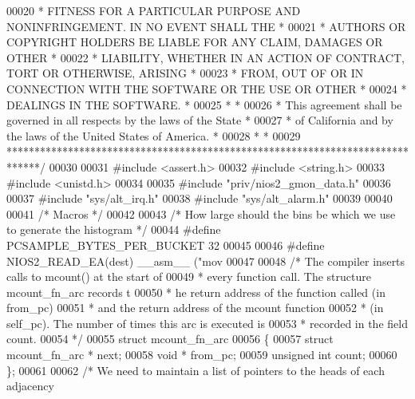 \begin{DoxyCode}
00020 \textcolor{comment}{* FITNESS FOR A PARTICULAR PURPOSE AND NONINFRINGEMENT. IN NO EVENT SHALL THE *}
00021 \textcolor{comment}{* AUTHORS OR COPYRIGHT HOLDERS BE LIABLE FOR ANY CLAIM, DAMAGES OR OTHER      *}
00022 \textcolor{comment}{* LIABILITY, WHETHER IN AN ACTION OF CONTRACT, TORT OR OTHERWISE, ARISING     *}
00023 \textcolor{comment}{* FROM, OUT OF OR IN CONNECTION WITH THE SOFTWARE OR THE USE OR OTHER         *}
00024 \textcolor{comment}{* DEALINGS IN THE SOFTWARE.                                                   *}
00025 \textcolor{comment}{*                                                                             *}
00026 \textcolor{comment}{* This agreement shall be governed in all respects by the laws of the State   *}
00027 \textcolor{comment}{* of California and by the laws of the United States of America.              *}
00028 \textcolor{comment}{*                                                                             *}
00029 \textcolor{comment}{******************************************************************************/}
00030 
00031 \textcolor{preprocessor}{#include <assert.h>}
00032 \textcolor{preprocessor}{#include <string.h>}
00033 \textcolor{preprocessor}{#include <unistd.h>}
00034 
00035 \textcolor{preprocessor}{#include "priv/nios2_gmon_data.h"}
00036 
00037 \textcolor{preprocessor}{#include "sys/alt_irq.h"}
00038 \textcolor{preprocessor}{#include "sys/alt_alarm.h"}
00039 
00040 
00041 \textcolor{comment}{/* Macros */}
00042 
00043 \textcolor{comment}{/* How large should the bins be which we use to generate the histogram */}
00044 \textcolor{preprocessor}{#define PCSAMPLE\_BYTES\_PER\_BUCKET 32}
00045 
00046 \textcolor{preprocessor}{#define NIOS2\_READ\_EA(dest)  \_\_asm\_\_ ("mov %
00047 
00048 \textcolor{comment}{/* The compiler inserts calls to mcount() at the start of}
00049 \textcolor{comment}{ * every function call. The structure mcount\_fn\_arc records t}
00050 \textcolor{comment}{ * he return address of the function called (in from\_pc)}
00051 \textcolor{comment}{ * and the return address of the mcount function}
00052 \textcolor{comment}{ * (in self\_pc). The number of times this arc is executed is}
00053 \textcolor{comment}{ * recorded in the field count.}
00054 \textcolor{comment}{ */}
00055 \textcolor{keyword}{struct }mcount_fn_arc
00056 \{
00057   \textcolor{keyword}{struct }mcount_fn_arc * next;
00058   \textcolor{keywordtype}{void} * from_pc;
00059   \textcolor{keywordtype}{unsigned} \textcolor{keywordtype}{int} count;
00060 \};
00061 
00062 \textcolor{comment}{/* We need to maintain a list of pointers to the heads of each adjacency}
}
\end{DoxyCode}
